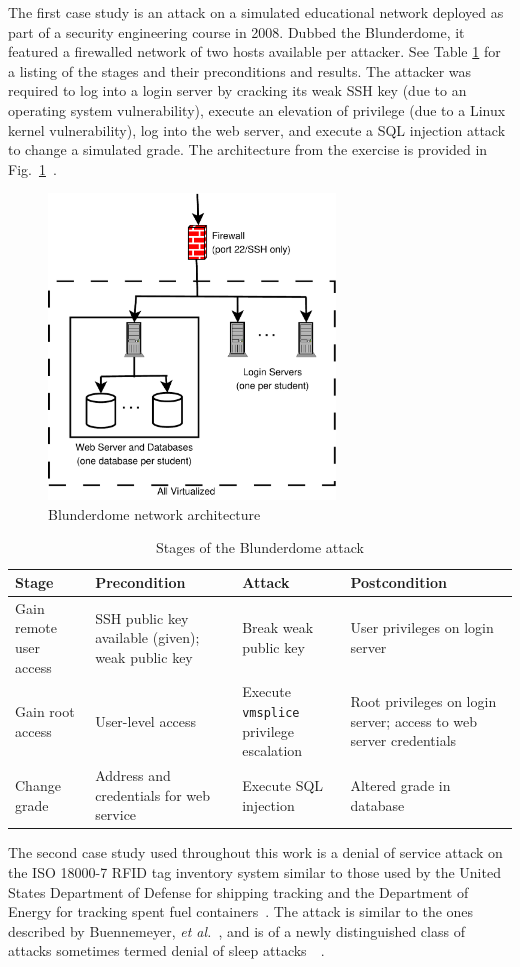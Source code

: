 The first case study is an attack on a simulated educational network deployed as part of a
security engineering course in 2008. Dubbed the Blunderdome, it featured a firewalled network of
two hosts available per attacker. See Table \ref{table:blundertasks} for a listing of the stages and
their preconditions and results. The attacker was required to log into a login server by cracking
its weak SSH key (due to an operating system vulnerability), execute an elevation of privilege (due
to a Linux kernel vulnerability), log into the web server, and execute a SQL injection attack to
change a simulated grade. The architecture from the exercise is provided in 
Fig.~\ref{fig:blunderarch}~\cite{louthan2010blunderdome}.

\begin{figure}
\centering
\includegraphics[width=3in]{blunderarch}
\caption{Blunderdome network architecture}
\label{fig:blunderarch}
\end{figure}

\begin{table}
\centering
\begin{tabular}{p{1.5in}|p{1in}|p{1in}|p{1in}}
Stage & Precondition	&	Attack	&	Postcondition \\ \hline \hline
Gain remote user access & SSH public key available (given); weak public key 
	& Break weak public key & User privileges on login server \\ \hline
Gain root access & User-level access & Execute \texttt{vmsplice} privilege escalation 
	& Root privileges on login server; access to web server credentials \\ \hline
Change grade & Address and credentials for web service & Execute SQL injection & Altered grade in database
\end{tabular}
\caption{Stages of the Blunderdome attack}
\label{table:blundertasks}
\end{table}
The second case study used throughout this work is a denial of service attack
on the ISO 18000-7 RFID tag inventory system similar to those used by the United States
Department of Defense for shipping tracking and the Department of Energy for tracking spent
fuel containers~\cite{chen2009radiofrequency}. The attack
is similar to the ones described by Buennemeyer, \emph{et al.}~\cite{buennemeyer2006battery},
and is of a newly distinguished class of attacks sometimes termed denial of sleep
attacks~\cite{brownfield2005wireless}~\cite{raymond2009effects}.

